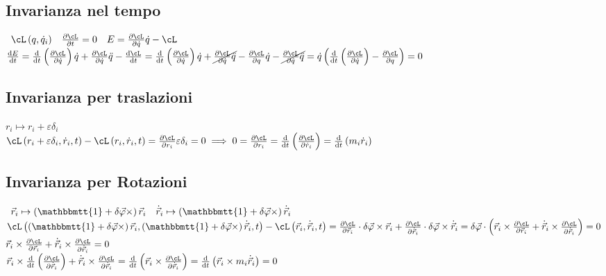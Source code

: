 \documentclass[a4paper,NoNotes,GeneralMath,12pt]{stdmdoc}
\begin{document}
	\subsection*{Invarianza nel tempo}
	$\begin{array}{ccc} \cL\left(q, \dot{q}_i\right) & \dpar{\cL}{t} = 0 & E = \dpar{\cL}{\dot{q}} \dot{q} - \cL \end{array}$ \\
	$\de{E}{t} = \de{}{t}\left(\dpar{\cL}{\dot{q}}\right) \dot{q} + \dpar{\cL}{\dot{q}} \ddot{q} - \de{\cL}{t} = \de{}{t}\left(\dpar{\cL}{\dot{q}}\right) \dot{q} + \cancel{\dpar{\cL}{\dot{q}} \ddot{q}} - \dpar{\cL}{q} \dot{q} - \cancel{\dpar{\cL}{\dot{q}} \ddot{q}} = \dot{q} \left(\de{}{t} \left(\dpar{\cL}{\dot{q}}\right) - \dpar{\cL}{q}\right) = 0$

	\subsection*{Invarianza per traslazioni}
	$r_i \mapsto r_i + \varepsilon \delta_i$ \\ $\cL \left(r_i + \varepsilon \delta_i, \dot{r}_i, t\right) - \cL \left(r_i, \dot{r}_i, t\right) = \dpar{\cL}{r_i} \varepsilon \delta_i = 0 \implies 0 = \dpar{\cL}{r_i} = \de{}{t} \left(\dpar{\cL}{\dot{r}_i}\right) = \de{}{t} \left(m_i \dot{r}_i \right)$

	\subsection*{Invarianza per Rotazioni}
	$\begin{array}{cc} \vec{r}_i \mapsto \left(\mathbbmtt{1} + \delta \vec{\varphi}\times \right) \vec{r}_i & \dot{\vec{r}}_i \mapsto \left(\mathbbmtt{1} + \delta \vec{\varphi} \times\right) {\dot{\vec{r}}_i} \end{array}$ \\
	$\cL\left( \left(\mathbbmtt{1} + \delta \vec{\varphi} \times\right) \vec{r}_i, \left(\mathbbmtt{1} + \delta \vec{\varphi} \times\right) \dot{\vec{r}}_i, t\right) - \cL\left( \vec{r}_i, \dot{\vec{r}}_i, t\right) = \dpar{\cL}{\vec{r}_i} \cdot \delta \vec{\varphi}\times \vec{r}_i + \dpar{\cL}{\dot{\vec{r}}_i} \cdot \delta \vec{\varphi} \times \dot{\vec{r}}_i = \delta \vec{\varphi} \cdot \left( \vec{r}_i \times \dpar{\cL}{\vec{r}_i} + \dot{\vec{r}}_i \times \dpar{\cL}{\dot{\vec{r}}_i} \right) = 0$ \\
	$\vec{r}_i \times \dpar{\cL}{\vec{r}_i} + \dot{\vec{r}}_i \times \dpar{\cL}{\dot{\vec{r}}_i} = 0$ \\ $\vec{r}_i \times \de{}{t} \left( \dpar{\cL}{\dot{\vec{r}}_i} \right) + \dot{\vec{r}}_i \times \dpar{\cL}{\dot{\vec{r}}_i} = \de{}{t} \left( \vec{r}_i \times \dpar{\cL}{\dot{\vec{r}}_i} \right) = \de{}{t} \left( \vec{r}_i \times m_i \dot{\vec{r}}_i \right) = 0$
\end{document}
